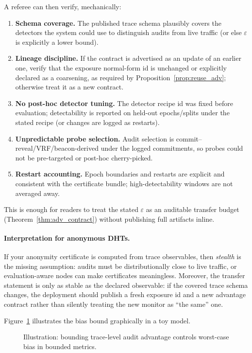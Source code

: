 \documentclass[11pt]{article}
\begin{document}
A referee can then verify, mechanically:
\begin{enumerate}
\item \textbf{Schema coverage.} The published trace schema plausibly covers the detectors the system could use to distinguish audits from live traffic (or else $\varepsilon$ is explicitly a lower bound).
\item \textbf{Lineage discipline.} If the contract is advertised as an update of an earlier one, verify that the exposure normal-form id is unchanged or explicitly declared as a coarsening, as required by Proposition~\ref{prop:reuse_adv}; otherwise treat it as a new contract.
\item \textbf{No post-hoc detector tuning.} The detector recipe id was fixed before evaluation; detectability is reported on held-out epochs/splits under the stated recipe (or changes are logged as restarts).
\item \textbf{Unpredictable probe selection.} Audit selection is commit--reveal/VRF/beacon-derived under the logged commitments, so probes could not be pre-targeted or post-hoc cherry-picked.
\item \textbf{Restart accounting.} Epoch boundaries and restarts are explicit and consistent with the certificate bundle; high-detectability windows are not averaged away.
\end{enumerate}
This is enough for readers to treat the stated $\varepsilon$ as an auditable transfer budget (Theorem~\ref{thm:adv_contract}) without publishing full artifacts inline.




\paragraph{Interpretation for anonymous DHTs.}
If your anonymity certificate is computed from trace observables, then \emph{stealth} is the missing assumption:
audits must be distributionally close to live traffic, or evaluation-aware nodes can make certificates meaningless.
Moreover, the transfer statement is only as stable as the declared observable: if the covered trace schema changes, the deployment should publish a fresh exposure id and a new advantage contract rather than silently treating the new monitor as ``the same'' one.

Figure~\ref{fig:adv_contract_bias} illustrates the bias bound graphically in a toy model.

\begin{figure}[t]
\centering
{}
\caption{Illustration: bounding trace-level audit advantage controls worst-case bias in bounded metrics.}
\label{fig:adv_contract_bias}
\end{figure}
\end{document}
